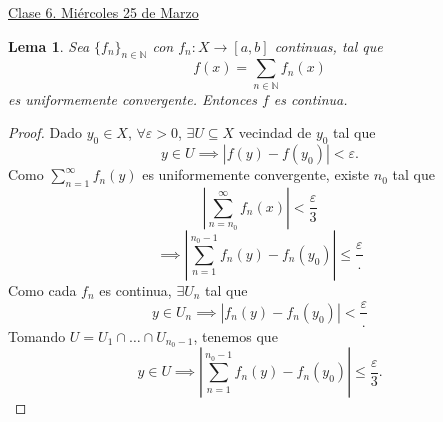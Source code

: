 \documentclass{article}
\newtheorem{lemma}[theorem]{Lema}
\theoremstyle{definition}
\theoremstyle{remark}
\numberwithin{equation}{section}
\newcommand{\N}{\mathbb{N}}
\newcommand{\e}{\varepsilon}
\newcommand{\oo}{\infty}
\newcommand{\abs}[1]{\left| #1 \right|}
\newcommand{\ds}{\displaystyle}
\newcommand{\fecha}[1]{\begin{flushright} \underline{#1} \end{flushright}}
\begin{document}
\fecha{Clase 6. Miércoles 25 de Marzo}

\begin{lemma}
  Sea $\{f_n\}_{n\in\N}$ con $f_n \colon X \to [a,b]$ continuas, tal que
  \[f(x) = \sum_{n\in\N} f_n(x)\]
  es uniformemente convergente. Entonces $f$ es continua.
\end{lemma}
\begin{proof}
  Dado $y_0 \in X$, $\forall \e>0$, $\exists U \subseteq X$ vecindad de $y_0$ tal que
  \[y \in U \implies \abs{f(y) - f(y_0)} < \e.\]
  Como $\ds \sum_{n=1}^\oo f_n(y)$ es uniformemente convergente, existe $n_0$ tal que
  \[\abs{\sum_{n=n_0}^\oo f_n(x)} < \frac{\e}{3}\]
  \[\implies \abs{\sum_{n=1}^{n_0-1} f_n(y) - f_n(y_0)} \leq \frac{\e}.\]
  Como cada $f_n$ es continua, $\exists U_n$ tal que
  \[y\in U_n \implies \abs{f_n(y) - f_n(y_0)} < \frac{\e}.\]
  Tomando $U = U_1 \cap \dots \cap U_{n_0-1}$, tenemos que
  \[y \in U \implies \abs{\sum_{n=1}^{n_0-1} f_n(y) - f_n(y_0)} \leq \frac{\e}{3}.\]
\end{proof}
\end{document}
